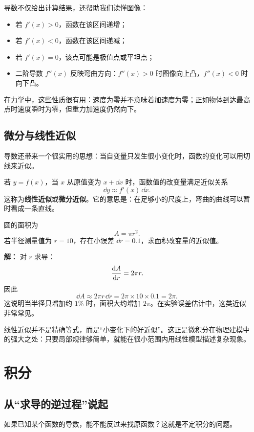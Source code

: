 导数不仅给出计算结果，还帮助我们读懂图像：
\begin{itemize}
  \item 若 $f'(x)>0$，函数在该区间递增；
  \item 若 $f'(x)<0$，函数在该区间递减；
  \item 若 $f'(x)=0$，该点可能是极值点或平坦点；
  \item 二阶导数 $f''(x)$ 反映弯曲方向：$f''(x)>0$ 时图像向上凸，$f''(x)<0$ 时向下凸。
\end{itemize}

在力学中，这些性质很有用：速度为零并不意味着加速度为零；正如物体到达最高点时速度瞬时为零，但重力加速度仍然向下。

\subsection{微分与线性近似}

导数还带来一个很实用的思想：当自变量只发生很小变化时，函数的变化可以用切线来近似。

若 $y=f(x)$，当 $x$ 从原值变为 $x+\dd x$ 时，函数值的改变量满足近似关系
\[
  \dd y \approx f'(x)\,\dd x.
\]
这称为\textbf{线性近似}或\textbf{微分近似}。它的意思是：在足够小的尺度上，弯曲的曲线可以暂时看成一条直线。

\begin{example}
圆的面积为
\[
  A=\pi r^2.
\]
若半径测量值为 $r=10$，存在小误差 $\dd r=0.1$，求面积改变量的近似值。

\textbf{解：} 对 $r$ 求导：
\[
  \dv{A}{r}=2\pi r.
\]
因此
\[
  \dd A \approx 2\pi r\,\dd r = 2\pi \times 10 \times 0.1 = 2\pi.
\]
这说明当半径只增加约 $1\%$ 时，面积大约增加 $2\pi$。在实验误差估计中，这类近似非常常见。
\end{example}

\begin{remark}
线性近似并不是精确等式，而是“小变化下的好近似”。这正是微积分在物理建模中的强大之处：只要局部规律够简单，就能在很小范围内用线性模型描述复杂现象。
\end{remark}

\section{积分}

\subsection{从“求导的逆过程”说起}

如果已知某个函数的导数，能不能反过来找原函数？这就是不定积分的问题。

